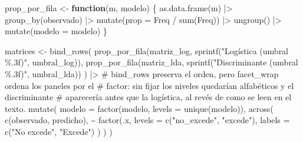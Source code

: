 \documentclass[
  spanish,
  letterpaper,
  DIV=11,
  numbers=noendperiod]{scrartcl}
\newenvironment{Shaded}{\begin{snugshade}}{\end{snugshade}}
\newcommand{\AttributeTok}[1]{\textcolor[rgb]{0.40,0.45,0.13}{#1}}
\newcommand{\CommentTok}[1]{\textcolor[rgb]{0.37,0.37,0.37}{#1}}
\newcommand{\ControlFlowTok}[1]{\textcolor[rgb]{0.00,0.23,0.31}{\textbf{#1}}}
\newcommand{\FunctionTok}[1]{\textcolor[rgb]{0.28,0.35,0.67}{#1}}
\newcommand{\NormalTok}[1]{\textcolor[rgb]{0.00,0.23,0.31}{#1}}
\newcommand{\OtherTok}[1]{\textcolor[rgb]{0.00,0.23,0.31}{#1}}
\newcommand{\SpecialCharTok}[1]{\textcolor[rgb]{0.37,0.37,0.37}{#1}}
\newcommand{\StringTok}[1]{\textcolor[rgb]{0.13,0.47,0.30}{#1}}
\begin{document}
\begin{Shaded}
\begin{Highlighting}[]
\NormalTok{prop\_por\_fila }\OtherTok{\textless{}{-}} \ControlFlowTok{function}\NormalTok{(m, modelo) \{}
    \FunctionTok{as.data.frame}\NormalTok{(m) }\SpecialCharTok{|\textgreater{}}
        \FunctionTok{group\_by}\NormalTok{(observado) }\SpecialCharTok{|\textgreater{}}
        \FunctionTok{mutate}\NormalTok{(}\AttributeTok{prop =}\NormalTok{ Freq }\SpecialCharTok{/} \FunctionTok{sum}\NormalTok{(Freq)) }\SpecialCharTok{|\textgreater{}}
        \FunctionTok{ungroup}\NormalTok{() }\SpecialCharTok{|\textgreater{}}
        \FunctionTok{mutate}\NormalTok{(}\AttributeTok{modelo =}\NormalTok{ modelo)}
\NormalTok{\}}

\NormalTok{matrices }\OtherTok{\textless{}{-}} \FunctionTok{bind\_rows}\NormalTok{(}
    \FunctionTok{prop\_por\_fila}\NormalTok{(matriz\_log, }\FunctionTok{sprintf}\NormalTok{(}\StringTok{"Logística (umbral \%.3f)"}\NormalTok{, umbral\_log)),}
    \FunctionTok{prop\_por\_fila}\NormalTok{(matriz\_lda, }\FunctionTok{sprintf}\NormalTok{(}\StringTok{"Discriminante (umbral \%.3f)"}\NormalTok{, umbral\_lda))}
\NormalTok{) }\SpecialCharTok{|\textgreater{}}
    \CommentTok{\# bind\_rows preserva el orden, pero facet\_wrap ordena los paneles por el}
    \CommentTok{\# factor: sin fijar los niveles quedarían alfabéticos y el discriminante}
    \CommentTok{\# aparecería antes que la logística, al revés de como se leen en el texto.}
    \FunctionTok{mutate}\NormalTok{(}
        \AttributeTok{modelo =} \FunctionTok{factor}\NormalTok{(modelo, }\AttributeTok{levels =} \FunctionTok{unique}\NormalTok{(modelo)),}
        \FunctionTok{across}\NormalTok{(}
            \FunctionTok{c}\NormalTok{(observado, predicho),}
            \SpecialCharTok{\textasciitilde{}} \FunctionTok{factor}\NormalTok{(.x,}
                \AttributeTok{levels =} \FunctionTok{c}\NormalTok{(}\StringTok{"no\_excede"}\NormalTok{, }\StringTok{"excede"}\NormalTok{),}
                \AttributeTok{labels =} \FunctionTok{c}\NormalTok{(}\StringTok{"No excede"}\NormalTok{, }\StringTok{"Excede"}\NormalTok{)}
\NormalTok{            )}
\NormalTok{        )}
\NormalTok{    )}


\end{Highlighting}
\end{Shaded}
\end{document}
